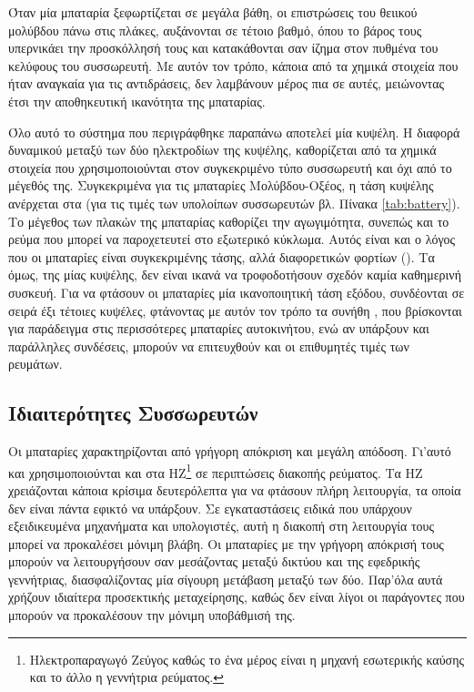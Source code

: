 \documentclass[12pt]{report}
\begin{document}
Όταν μία μπαταρία ξεφωρτίζεται σε μεγάλα βάθη, οι επιστρώσεις του θειικού μολύβδου πάνω στις πλάκες, αυξάνονται σε τέτοιο βαθμό, όπου το βάρος τους υπερνικάει την προσκόλλησή τους και κατακάθονται σαν ίζημα στον πυθμένα του κελύφους
του συσσωρευτή. Με αυτόν τον τρόπο, κάποια από τα χημικά στοιχεία που ήταν αναγκαία για τις αντιδράσεις, δεν λαμβάνουν μέρος πια σε αυτές, μειώνοντας έτσι την αποθηκευτική ικανότητα της μπαταρίας.

Όλο αυτό το σύστημα που περιγράφθηκε παραπάνω αποτελεί μία κυψέλη. Η διαφορά δυναμικού μεταξύ των δύο ηλεκτροδίων της κυψέλης, καθορίζεται από τα χημικά στοιχεία που χρησιμοποιούνται στον συγκεκριμένο τύπο συσσωρευτή και όχι
από το μέγεθός της. 
Συγκεκριμένα για τις μπαταρίες Μολύβδου-Οξέος, η τάση κυψέλης ανέρχεται στα {} (για τις τιμές των υπολοίπων συσσωρευτών βλ. Πίνακα \ref{tab:battery}). Το μέγεθος των πλακών της μπαταρίας καθορίζει 
την αγωγιμότητα, συνεπώς και το ρεύμα που μπορεί να παροχετευτεί στο εξωτερικό κύκλωμα. Αυτός είναι και ο λόγος που οι μπαταρίες είναι συγκεκριμένης τάσης, αλλά διαφορετικών φορτίων ({}). 
Τα {} όμως, της μίας κυψέλης, δεν είναι ικανά να τροφοδοτήσουν σχεδόν καμία καθημερινή συσκευή. Για να φτάσουν οι μπαταρίες μία ικανοποιητική τάση εξόδου, συνδέονται σε σειρά έξι τέτοιες κυψέλες, 
φτάνοντας με αυτόν τον τρόπο τα συνήθη {}, που βρίσκονται για παράδειγμα στις περισσότερες μπαταρίες αυτοκινήτου, ενώ αν υπάρξουν και παράλληλες συνδέσεις, μπορούν να επιτευχθούν και οι επιθυμητές τιμές των ρευμάτων.

\subsection{Ιδιαιτερότητες Συσσωρευτών}
Οι μπαταρίες χαρακτηρίζονται από γρήγορη απόκριση και μεγάλη απόδοση. Γι'αυτό και χρησιμοποιούνται και στα ΗΖ\footnote{Ηλεκτροπαραγωγό Ζεύγος καθώς το ένα μέρος είναι η μηχανή εσωτερικής καύσης και το άλλο η γεννήτρια ρεύματος.} 
σε περιπτώσεις διακοπής ρεύματος. Τα ΗΖ χρειάζονται κάποια κρίσιμα δευτερόλεπτα για να φτάσουν πλήρη λειτουργία, τα οποία δεν είναι πάντα εφικτό να υπάρξουν. Σε εγκαταστάσεις ειδικά που υπάρχουν εξειδικευμένα μηχανήματα και 
υπολογιστές, αυτή η διακοπή στη λειτουργία τους μπορεί να προκαλέσει μόνιμη βλάβη. Οι μπαταρίες με την γρήγορη απόκρισή τους μπορούν να λειτουργήσουν σαν μεσάζοντας μεταξύ δικτύου και της εφεδρικής γεννήτριας, διασφαλίζοντας μία 
σίγουρη μετάβαση μεταξύ των δύο. Παρ'όλα αυτά χρήζουν ιδιαίτερα προσεκτικής μεταχείρησης, καθώς δεν είναι λίγοι οι παράγοντες που μπορούν να προκαλέσουν την μόνιμη υποβάθμισή της.
\end{document}
